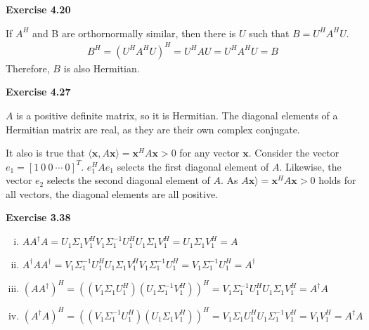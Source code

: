 \documentclass[letterpaper,12pt]{article}
\newcommand{\vect}[1]{\mathbf{#1}}
\begin{document}
\textbf{Exercise 4.20}

If $A^H$ and B are orthornormally similar, then there is $U$ such that $B = U^HA^HU$.
\begin{align*}
B^H = (U^HA^HU)^H = U^H A U = U^H A^H U = B
\end{align*}
Therefore, $B$ is also Hermitian.

\textbf{Exercise 4.27}

$A$ is a positive definite matrix, so it is Hermitian. The diagonal elements of a Hermitian matrix are real, as they are their own complex conjugate.

It also is true that $\langle \vect{x},  A\vect{x} \rangle = \vect{x}^H A \vect{x} > 0$ for any vector $\vect{x}$. Consider the vector $e_1 = [1 \ 0 \ 0 \ \cdots \ 0]^T$. $e_1^H A e_1$ selects the first diagonal element of $A$. Likewise, the vector $e_2$ selects the second diagonal element of $A$. As $A\vect{x} \rangle = \vect{x}^H A \vect{x} > 0$ holds for all vectors, the diagonal elements are all positive.

\textbf{Exercise 3.38}

\begin{enumerate}[i)]
	\item $AA^{\dagger}A = U_1 \Sigma_1 V_1^H V_1 \Sigma_1^{-1} U_1^H U_1 \Sigma_1 V_1^H = U_1  \Sigma_1 V_1^H = A $
	\item $A^{\dagger} A A^{\dagger} = V_1 \Sigma_1^{-1} U_1^H U_1 \Sigma_1 V_1^H V_1 \Sigma_1^{-1} U_1^H =  V_1 \Sigma_1^{-1} U_1^H = A^{\dagger}$
	\item $(A A^{\dagger})^H = ((V_1 \Sigma_1 U_1^H) (U_1 \Sigma_1^{-1} V_1^H))^H = V_1 \Sigma_1^{-1} U_1^H U_1 \Sigma_1 V_1^H = A^{\dagger} A$
	\item $(A^{\dagger} A)^H = (( V_1 \Sigma_1^{-1} U_1^H)(U_1 \Sigma_1 V_1^H))^H = V_1 \Sigma_1 U_1^H U_1 \Sigma_1^{-1} V_1^H = V_1 V_1^H = A^{\dagger} A$
\end{enumerate}
\end{document}
